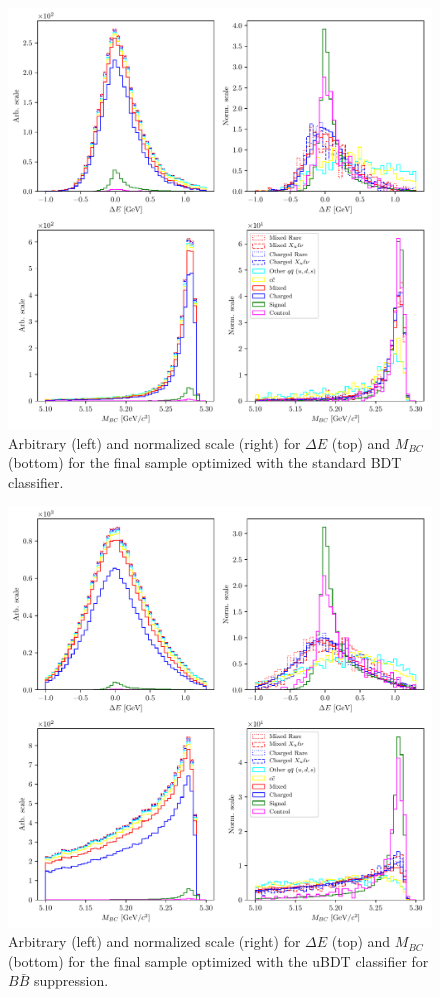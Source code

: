 \begin{figure}[H]
\centering
\captionsetup{width=0.8\linewidth}
\includegraphics[width=\linewidth]{fig/opt_BB}
\caption{Arbitrary (left) and normalized scale (right) for $\Delta E$ (top) and $M_{BC}$ (bottom) for the final sample optimized with the standard BDT classifier.}
\label{fig:opt01c}
\end{figure} 

\begin{figure}[H]
\centering
\captionsetup{width=0.8\linewidth}
\includegraphics[width=\linewidth]{fig/opt_uBB}
\caption{Arbitrary (left) and normalized scale (right) for $\Delta E$ (top) and $M_{BC}$ (bottom) for the final sample optimized with the uBDT classifier for $B \bar B$ suppression.}
\label{fig:opt1dc}
\end{figure} 

